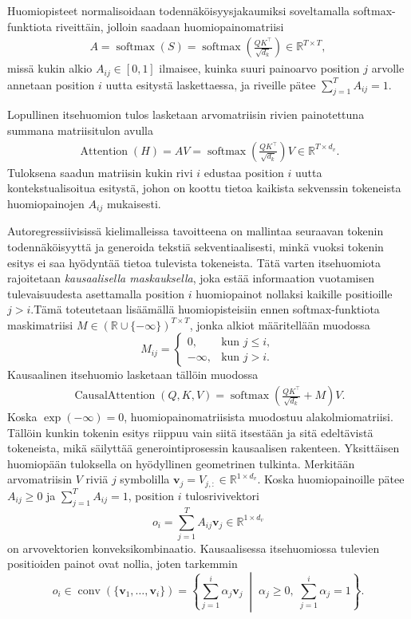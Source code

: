 Huomiopisteet normalisoidaan todennäköisyysjakaumiksi soveltamalla softmax-funktiota riveittäin, jolloin saadaan huomiopainomatriisi
\begin{align*}
  A = \operatorname{softmax}(S) = \operatorname{softmax}\left(\frac{QK^{\top}}{\sqrt{d_k}}\right) \in \mathbb{R}^{T \times T},
\end{align*}
missä kukin alkio \(A_{ij} \in [0, 1]\) ilmaisee, kuinka suuri painoarvo position \(j\) arvolle annetaan position \(i\) uutta esitystä laskettaessa, ja riveille pätee \(\sum_{j=1}^{T} A_{ij} = 1\).

Lopullinen itsehuomion tulos lasketaan arvomatriisin rivien
painotettuna summana matriisitulon avulla
\begin{align*}
  \operatorname{Attention}(H)
  =
  AV
  =
  \operatorname{softmax}
  \left(
    \frac{QK^{\top}}{\sqrt{d_k}}
  \right)V
  \in
  \mathbb{R}^{T \times d_v}.
\end{align*}
Tuloksena saadun matriisin kukin rivi \(i\) edustaa position \(i\)
uutta kontekstualisoitua esitystä, johon on koottu tietoa kaikista
sekvenssin tokeneista huomiopainojen \(A_{ij}\) mukaisesti.

Autoregressiivisissä kielimalleissa tavoitteena on mallintaa seuraavan tokenin todennäköisyyttä ja generoida tekstiä sekventiaalisesti, minkä vuoksi tokenin esitys ei saa hyödyntää tietoa tulevista tokeneista. Tätä varten itsehuomiota rajoitetaan \emph{kausaalisella maskauksella}, joka estää informaation vuotamisen tulevaisuudesta asettamalla position \(i\) huomiopainot nollaksi kaikille positioille \(j > i\).Tämä toteutetaan lisäämällä huomiopisteisiin ennen
softmax-funktiota maskimatriisi
\(M \in (\mathbb{R} \cup \{-\infty\})^{T \times T}\),
jonka alkiot määritellään muodossa
$$
M_{ij} =
\begin{cases}
  0, & \text{kun } j \le i, \\
  -\infty, & \text{kun } j > i.
\end{cases}
$$
Kausaalinen itsehuomio lasketaan tällöin muodossa
\begin{align*}
  \operatorname{CausalAttention}(Q,K,V) = \operatorname{softmax}\left(\frac{QK^{\top}}{\sqrt{d_k}} + M\right)V.
\end{align*}
Koska \(\exp(-\infty) = 0\), huomiopainomatriisista muodostuu alakolmiomatriisi. Tällöin kunkin tokenin esitys riippuu vain siitä itsestään ja sitä edeltävistä tokeneista, mikä säilyttää generointiprosessin kausaalisen rakenteen.
Yksittäisen huomiopään tuloksella on hyödyllinen geometrinen
tulkinta. Merkitään arvomatriisin \(V\) riviä \(j\)
symbolilla \(\mathbf{v}_j = V_{j,:} \in \mathbb{R}^{1 \times d_v}\).
Koska huomiopainoille pätee \(A_{ij} \ge 0\) ja
\(\sum_{j=1}^{T} A_{ij} = 1\), position \(i\) tulosrivivektori
$$
o_i = \sum_{j=1}^{T} A_{ij} \mathbf{v}_j \in \mathbb{R}^{1 \times d_v}
$$
on arvovektorien konveksikombinaatio. Kausaalisessa itsehuomiossa
tulevien positioiden painot ovat nollia, joten tarkemmin
$$
o_i
\in
\operatorname{conv}(\{\mathbf{v}_1,\dots,\mathbf{v}_i\})
=
\left\{
  \sum_{j=1}^{i} \alpha_j \mathbf{v}_j
  \;\middle|\;
  \alpha_j \ge 0,\;
  \sum_{j=1}^{i} \alpha_j = 1
\right\}.
$$


